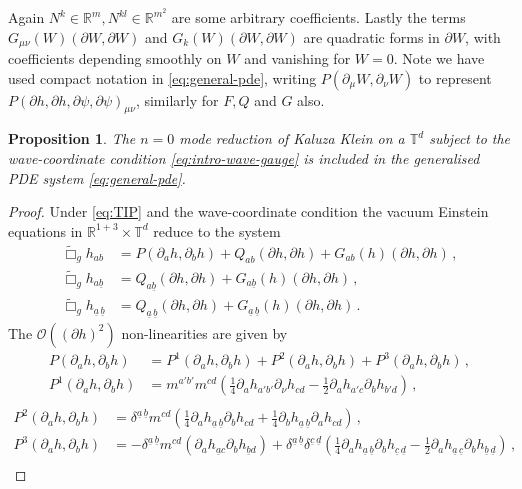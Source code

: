 \documentclass[11pt, a4paper]{amsart}
\numberwithin{equation}{section}
\newtheorem{proposition}[theorem]{Proposition}
\numberwithin{theorem}{section}
\newcommand{\R}{\mathbb{R}}
\newcommand{\p}{\partial}
\newcommand{\mn}{{\mu \nu}}
\newcommand{\tee}{{\mathbb{T}^d}}
\newcommand{\abar}{{\underline{a}}}
\newcommand{\bbar}{{\underline{b}}}
\newcommand{\cbar}{{\underline{c}}}
\newcommand{\dbar}{{\underline{d}}}
\newcommand{\abbar}{{\underline{a} \, \underline{b}}}
\newcommand{\tbox}{\widetilde{\Box}}
\begin{document}
Again $N^k \in \R^m, N^{kl} \in \R^{m^2}$ are some arbitrary coefficients.
Lastly the terms $G_\mn (W)(\p W, \p W)$ and $G_k (W)(\p W, \p W)$ are quadratic forms in $\p W$, with coefficients depending smoothly on $W$ and vanishing for $W=0$. Note we have used compact notation in \eqref{eq:general-pde}, writing $P( \p_\mu W, \p_\nu W)$ to represent $ P(\p h, \p h, \p \psi, \p \psi)_\mn$, similarly for $F, Q$ and $G$ also. 

\begin{proposition} \label{remark:torus-full-pde}
The $n=0$ mode reduction of Kaluza Klein on a $\tee$ subject to the wave-coordinate condition \eqref{eq:intro-wave-gauge} is included in the generalised PDE system \eqref{eq:general-pde}.
\end{proposition}

\begin{proof}
Under \eqref{eq:TIP} and the wave-coordinate condition the vacuum Einstein equations in $\R^{1+3} \times \tee$ reduce to the system
\begin{subequations}
\begin{align}
\tbox_g h_{ab} &= P(\p_a h, \p_b h)  + Q_{ab} (\p h, \p h) + G_{ab} (h) (\p h, \p h) \,, \label{eq:torus-pde-1}\\
\tbox_g h_{a \bbar} &= Q_{a \bbar} (\p h, \p h) + G_{a \bbar} (h) (\p h, \p h)\,, \\
\tbox_g h_\abbar &= Q_\abbar (\p h, \p h) + G_\abbar (h) (\p h, \p h) \,.
\end{align} \label{eq:torus-pde}
\end{subequations}
The $\mathcal{O}((\p h)^2)$ non-linearities are given by 
\begin{align*}
P(\p_a h, \p_b h) &= P^1(\p_a h, \p_b h)+P^2(\p_a h, \p_b h)+P^3(\p_a h, \p_b h) \,, \\
P^1 (\p_a h, \p_b h) &  =  m^{a'b'} m^{cd} \left( \frac{1}{4} \p_a h_{a'b'} \p_\nu h_{cd} - \frac{1}{2} \p_a h_{a'c} \p_b h_{b'd} \right) \,, \\
\end{align*}
\begin{align*}
P^2 (\p_a h, \p_b h)& = \delta^\abbar m^{cd} \left( \frac{1}{4}  \p_a h_\abbar\p_b h_{cd} + \frac{1}{4}  \p_b h_\abbar \p_a h_{cd}   \right) \,, \\
P^3 (\p_a h, \p_b h)& = - \delta^\abbar m^{cd} \left( \p_a h_{\abar c} \p_b h_{\bbar d} \right) + \delta^\abbar \delta^{\cbar \, \dbar} \left( \frac{1}{4} \p_a h_\abbar \p_b h_{\cbar \, \dbar} - \frac{1}{2}  \p_a h_{\abar \, \cbar} \p_b h_{\bbar \, \dbar} \right) \,,\\

\end{align*}
\end{proof}
\end{document}
